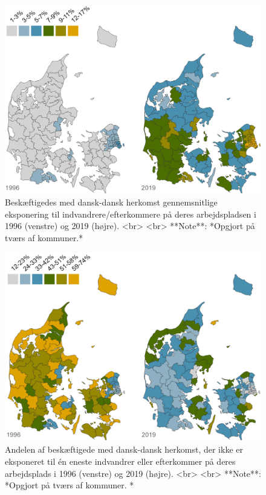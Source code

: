 \documentclass[
]{book}
\begin{document}
\begin{figure}
\includegraphics[width=1\linewidth]{images/Figur_4_1} \caption{Beskæftigedes med dansk-dansk herkomst gennemsnitlige eksponering til indvandrere/efterkommere på deres arbejdspladsen i 1996 (venstre) og 2019 (højre). <br> <br> **Note**: *Opgjort på tværs af kommuner.*}\label{fig:fig-4-1}
\end{figure}

\begin{figure}
\includegraphics[width=1\linewidth]{images/Figur_4_2} \caption{Andelen af beskæftigede med dansk-dansk herkomst, der ikke er eksponeret til én eneste indvandrer eller efterkommer på deres arbejdsplads i 1996 (venstre) og 2019 (højre). <br> <br> **Note**: *Opgjort på tværs af kommuner. *}\label{fig:fig-4-2}
\end{figure}
\end{document}
